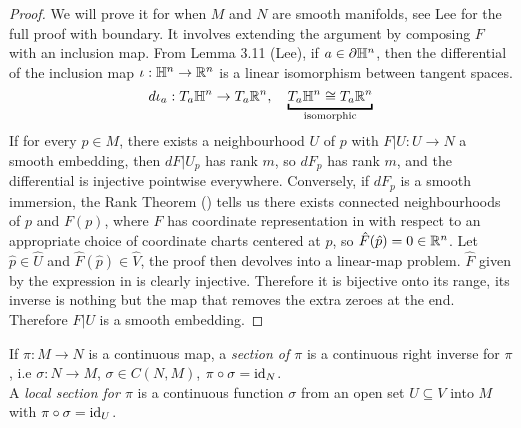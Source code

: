 \documentclass[../main-manifolds.tex]{subfiles}
\begin{document}
\begin{proof}
    We will prove it for when $M$ and $N$ are smooth manifolds, see Lee for the full proof with boundary. It involves extending the argument by composing $F$ with an inclusion map. From Lemma 3.11 (Lee), if $a\in \partial{\mathbb{H}^n}$, then the differential of the inclusion map $\iota:{\mathbb{H}^n}\to{\mathbb{R}^n}$ is a linear isomorphism between tangent spaces.
    \[
        d\iota_a:T_a\halfn\to T_a\realn,\quad \underbracket{T_a\halfn\cong T_a\realn}_{\text{isomorphic}}
    \]
    If for every $p\in M$, there exists a neighbourhood $U$ of $p$ with $F|U: U\to N$ a smooth embedding, then $dF|U_p$ has rank $m$, so $dF_p$ has rank $m$, and the differential is injective pointwise everywhere. Conversely, if $dF_p$ is a smooth immersion, the Rank Theorem () tells us there exists connected neighbourhoods of $p$ and $F(p)$, where $F$ has coordinate representation in  with respect to an appropriate choice of coordinate charts centered at $p$, so $\hat{F}(\hat{p})=0\in{\mathbb{R}^n}$. Let $\hat{p}\in \hat{U}$ and $\hat{F}(\hat{p})\in \hat{V}$, the proof then devolves into a linear-map problem. $\hat{F}$ given by the expression in  is clearly injective. Therefore it is bijective onto its range, its inverse is nothing but the map that removes the extra zeroes at the end. Therefore $F|U$ is a smooth embedding.
\end{proof}
\begin{definition}[Section of $\pi: M\to N$]\label{lee-chp4:section-of-continuous-map}
   If $\pi: M\to N$ is a continuous map, a \emph{section of $\pi$} is a continuous right inverse for $\pi$, i.e $\sigma:N\to M$, $\sigma\in C(N,M)$, $\pi\circ\sigma=\operatorname{id}_{N}$.\\

   A \emph{local section for $\pi$} is a continuous function $\sigma$ from an open set $U\subseteq V$ into $M$ with $\pi\circ\sigma=\operatorname{id}_{U}$. 
\end{definition}
\end{document}
